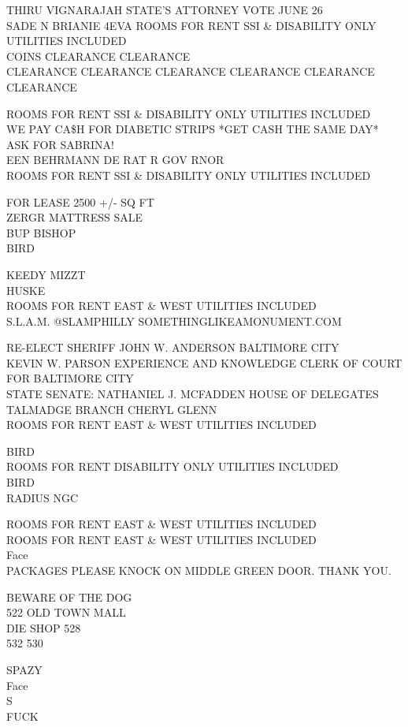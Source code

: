 \documentclass[10pt,letterpaper]{article}
\begin{document}
THIRU VIGNARAJAH STATE'S ATTORNEY VOTE JUNE 26\\
SADE N BRIANIE 4EVA ROOMS FOR RENT SSI \& DISABILITY ONLY UTILITIES INCLUDED\\
COINS CLEARANCE CLEARANCE\\
CLEARANCE CLEARANCE CLEARANCE CLEARANCE CLEARANCE CLEARANCE

ROOMS FOR RENT SSI \& DISABILITY ONLY UTILITIES INCLUDED\\
WE PAY CA\$H FOR DIABETIC STRIPS *GET CASH THE SAME DAY* ASK FOR SABRINA!\\
EEN BEHRMANN DE RAT R GOV RNOR\\
ROOMS FOR RENT SSI \& DISABILITY ONLY UTILITIES INCLUDED

FOR LEASE 2500 +/{-} SQ FT\\
ZERGR MATTRESS SALE\\
BUP BISHOP\\
BIRD

KEEDY MIZZT\\
HUSKE\\
ROOMS FOR RENT EAST \& WEST UTILITIES INCLUDED\\
S.L.A.M. @SLAMPHILLY SOMETHINGLIKEAMONUMENT.COM

RE{-}ELECT SHERIFF JOHN W. ANDERSON BALTIMORE CITY\\
KEVIN W. PARSON EXPERIENCE AND KNOWLEDGE CLERK OF COURT FOR BALTIMORE CITY\\
STATE SENATE: NATHANIEL J. MCFADDEN HOUSE OF DELEGATES TALMADGE BRANCH CHERYL GLENN\\
ROOMS FOR RENT EAST \& WEST UTILITIES INCLUDED

BIRD\\
ROOMS FOR RENT DISABILITY ONLY UTILITIES INCLUDED\\
BIRD\\
RADIUS NGC

ROOMS FOR RENT EAST \& WEST UTILITIES INCLUDED\\
ROOMS FOR RENT EAST \& WEST UTILITIES INCLUDED\\
Face\\
PACKAGES PLEASE KNOCK ON MIDDLE GREEN DOOR.  THANK YOU.

BEWARE OF THE DOG\\
522 OLD TOWN MALL\\
DIE SHOP 528\\
532 530

SPAZY\\
Face\\
S\\
FUCK
\end{document}
